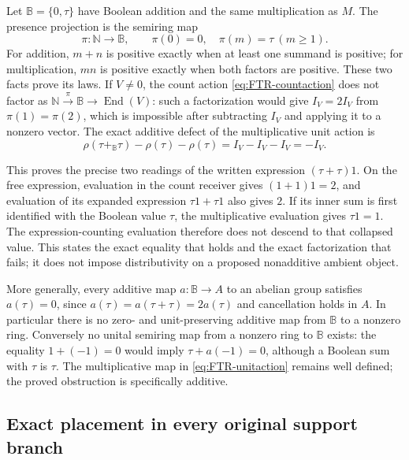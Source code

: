 Let $\mathbb B=\{0,\tau\}$ have Boolean addition and the same
multiplication as $M$. The presence projection is the semiring
map
\begin{equation}\tag{FTR4}\label{eq:FTR-presence}
 \pi:\mathbb N\longrightarrow\mathbb B,
       \qquad\pi(0)=0,\quad\pi(m)=\tau\ (m\geq1).
\end{equation}
For addition, $m+n$ is positive exactly when at least one
summand is positive; for multiplication, $mn$ is positive exactly
when both factors are positive. These two facts prove its laws.
If $V\ne0$, the count action \eqref{eq:FTR-countaction} does
not factor as $\mathbb N\xrightarrow\pi\mathbb B\to
\operatorname{End}(V)$: such a factorization would give
$I_V=2I_V$ from $\pi(1)=\pi(2)$, which is impossible after
subtracting $I_V$ and applying it to a nonzero vector.
The exact additive defect of the multiplicative unit action is
\begin{equation}\tag{FTR5}\label{eq:FTR-additivedefect}
 \rho(\tau+_{\mathbb B}\tau)
       -\rho(\tau)-\rho(\tau)
       =I_V-I_V-I_V=-I_V.
\end{equation}

This proves the precise two readings of the written expression
$(\tau+\tau)1$. On the free expression, evaluation in the count
receiver gives $(1+1)1=2$, and evaluation of its expanded
expression $\tau1+\tau1$ also gives $2$.
If its inner sum is first identified with the Boolean value
$\tau$, the multiplicative evaluation gives $\tau1=1$.
The expression-counting evaluation therefore does not descend to
that collapsed value. This states the exact equality that holds
and the exact factorization that fails; it does not impose
distributivity on a proposed nonadditive ambient object.

More generally, every additive map $a:\mathbb B\to A$ to an
abelian group satisfies $a(\tau)=0$, since
$a(\tau)=a(\tau+\tau)=2a(\tau)$ and cancellation holds in $A$.
In particular there is no zero- and unit-preserving additive
map from $\mathbb B$ to a nonzero ring. Conversely no unital
semiring map from a nonzero ring to $\mathbb B$ exists:
the equality $1+(-1)=0$ would imply
$\tau+a(-1)=0$, although a Boolean sum with $\tau$ is $\tau$.
The multiplicative map in \eqref{eq:FTR-unitaction} remains well defined;
the proved obstruction is specifically additive.

\subsection{Exact placement in every original support branch}

